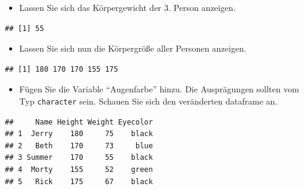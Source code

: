 \documentclass[12pt,a4paper]{article}
\newenvironment{Shaded}{\begin{snugshade}}{\end{snugshade}}
\newcommand{\DecValTok}[1]{\textcolor[rgb]{0.00,0.00,0.81}{#1}}
\newcommand{\FunctionTok}[1]{\textcolor[rgb]{0.00,0.00,0.00}{#1}}
\newcommand{\NormalTok}[1]{#1}
\newcommand{\OtherTok}[1]{\textcolor[rgb]{0.56,0.35,0.01}{#1}}
\newcommand{\SpecialCharTok}[1]{\textcolor[rgb]{0.00,0.00,0.00}{#1}}
\newcommand{\StringTok}[1]{\textcolor[rgb]{0.31,0.60,0.02}{#1}}
\begin{document}
\begin{itemize}
  \item Lassen Sie sich das Körpergewicht der 3. Person anzeigen.
\end{itemize}

\begin{Shaded}
\end{Shaded}

\begin{verbatim}
## [1] 55
\end{verbatim}

\begin{itemize}
  \item Lassen Sie sich nun die Körpergröße aller Personen anzeigen.
\end{itemize}

\begin{Shaded}
\end{Shaded}

\begin{verbatim}
## [1] 180 170 170 155 175
\end{verbatim}

\begin{itemize}
  \item Fügen Sie die Variable “Augenfarbe” hinzu. Die Ausprägungen sollten vom Typ \texttt{character} sein. Schauen Sie sich den veränderten dataframe an.
\end{itemize}

\begin{Shaded}
\end{Shaded}

\begin{verbatim}
##     Name Height Weight Eyecolor
## 1  Jerry    180     75    black
## 2   Beth    170     73     blue
## 3 Summer    170     55    black
## 4  Morty    155     52    green
## 5   Rick    175     67    black
\end{verbatim}
\end{document}
